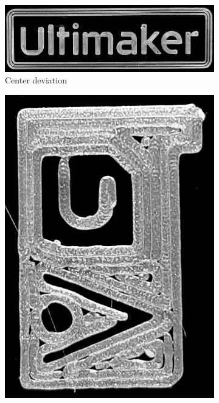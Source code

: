 \begin{figure}
\begin{subfigure}{\figwidth}
\includegraphics[width=\figwidth]{sources/applications/P3_print_UM_center_edited.png}
\caption{Center deviation}\label{print_center}
\end{subfigure}
\begin{subfigure}{\figwidth}\centering
\includegraphics[height=\figheightTwo]{sources/applications/gMAT_inward.png}

\end{subfigure}
\end{figure}
